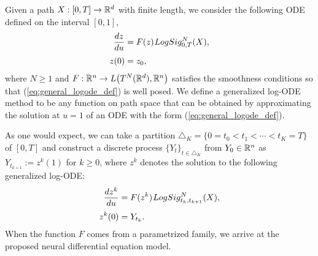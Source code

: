 \begin{definition} Given a path $X:[0,T]\rightarrow\mathbb{R}^d$ with finite length, we consider the following ODE defined on the interval $[0,1]$,
\begin{align}
\frac{dz}{du} & = F(z)\hspace{0.25mm} LogSig_{0,T}^N(X),\label{eq:general_logode_def}\\[3pt]
z(0) & = z_0,\nonumber
\end{align}
where $N\geq 1$ and $F : \mathbb{R}^n \rightarrow L\big(T^N(\mathbb{R}^d), \mathbb{R}^n\big)$ satisfies the smoothness conditions so that (\ref{eq:general_logode_def}) is well posed. We define a generalized log-ODE method to be any function on path space that can be obtained by approximating the solution at $u = 1$ of an ODE with the form (\ref{eq:general_logode_def}).
\end{definition}
\begin{remark}
As one would expect, we can take a partition $\triangle_K = \{0 = t_0 < t_1 <\cdots < t_K = T\}$ of $[0,T]$ and construct a discrete process $\{Y_t\}_{t\in\triangle_K}$ from $Y_0\in\mathbb{R}^n$ as $Y_{t_{k+1}} := z^k(1)$ for $k\geq 0$, where $z^k$ denotes the solution to the following generalized log-ODE:
\begin{align*}
\frac{dz^k}{du} & = F(z^k)\hspace{0.25mm} LogSig_{t_k,t_{k+1}}^N(X),\\[3pt]
z^k(0) & = Y_{t_k}.
\end{align*}
When the function $F$ comes from a parametrized family, we arrive at the proposed neural differential equation model.
\end{remark}